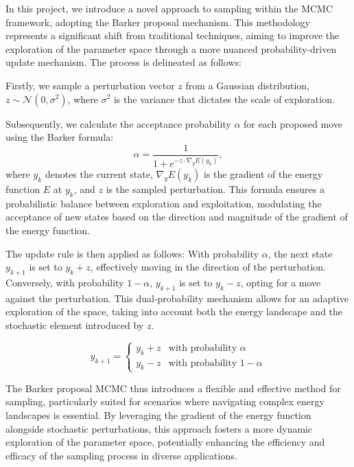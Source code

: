 \documentclass{article}
\begin{document}
In this project, we introduce a novel approach to sampling within the MCMC framework, adopting the Barker proposal mechanism. This methodology represents a significant shift from traditional techniques, aiming to improve the exploration of the parameter space through a more nuanced probability-driven update mechanism. The process is delineated as follows:

Firstly, we sample a perturbation vector \(z\) from a Gaussian distribution, \(z \sim \mathcal{N}(0, \sigma^2)\), where \(\sigma^2\) is the variance that dictates the scale of exploration.

Subsequently, we calculate the acceptance probability \(\alpha\) for each proposed move using the Barker formula:
\begin{equation}
    \alpha = \frac{1}{1+e^{-z \cdot \nabla_{y} E(y_k)}},
\end{equation}
where \(y_k\) denotes the current state, \(\nabla_{y} E(y_k)\) is the gradient of the energy function \(E\) at \(y_k\), and \(z\) is the sampled perturbation. This formula ensures a probabilistic balance between exploration and exploitation, modulating the acceptance of new states based on the direction and magnitude of the gradient of the energy function.

The update rule is then applied as follows: With probability \(\alpha\), the next state \(y_{k+1}\) is set to \(y_k + z\), effectively moving in the direction of the perturbation. Conversely, with probability \(1-\alpha\), \(y_{k+1}\) is set to \(y_k - z\), opting for a move against the perturbation. This dual-probability mechanism allows for an adaptive exploration of the space, taking into account both the energy landscape and the stochastic element introduced by \(z\).

\begin{equation}
    y_{k+1} =
    \begin{cases}
        y_k + z & \text{with probability } \alpha   \\
        y_k - z & \text{with probability } 1-\alpha
    \end{cases}
\end{equation}

The Barker proposal MCMC thus introduces a flexible and effective method for sampling, particularly suited for scenarios where navigating complex energy landscapes is essential. By leveraging the gradient of the energy function alongside stochastic perturbations, this approach fosters a more dynamic exploration of the parameter space, potentially enhancing the efficiency and efficacy of the sampling process in diverse applications.

\end{document}

